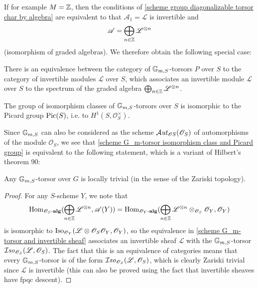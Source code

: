 If for example $M=\mathbb{Z}$, then the conditions of \cref{scheme group diagonalizable torsor char by algebra} are equivalent to that $\mathscr{A}_1=\mathscr{L}$ is invertible and 
\[\mathscr{A}=\bigoplus_{n\in\mathbb{Z}}\mathscr{L}^{\otimes n}\]
(isomorphism of graded algebras). We therefore obtain the following special case:

\begin{corollary}\label{scheme G_m-torsor and invertible sheaf}
There is an equivalence between the category of $\mathbb{G}_{m,S}$-torsors $P$ over $S$ to the category of invertible modules $\mathscr{L}$ over $S$, which associates an invertible module $\mathscr{L}$ over $S$ to the spectrum of the graded algebra $\bigoplus_{n\in\mathbb{Z}}\mathscr{L}^{\otimes n}$.
\end{corollary}

\begin{corollary}\label{scheme G_m-torsor isomorphism class and Picard group}
The group of isomorphism classes of $\mathbb{G}_{m,S}$-torsors over $S$ is isomorphic to the Picard group $\mathrm{Pic}(S)$, i.e. to $H^1(S,\mathscr{O}_S^\times)$.
\end{corollary}

Since $\mathbb{G}_{m,S}$ can also be considered as the scheme $\operatorname{\mathcal{A}\hspace*{-0.2pt}\textit{ut}\hspace{0.5pt}}_{\mathscr{O}S}(\mathscr{O}_S)$ of automorphisms of the module $\mathscr{O}_S$, we see that \cref{scheme G_m-torsor isomorphism class and Picard group} is equivalent to the following statement, which is a variant of Hilbert's theorem 90:

\begin{corollary}\label{scheme G_m-torsor Zariski local trivial}
Any $\mathbb{G}_{m,S}$-torsor over $G$ is locally trivial (in the sense of the Zariski topology).
\end{corollary}
\begin{proof}
For any $S$-scheme $Y$, we note that
\[\mathrm{Hom}_{\mathscr{O}_S\text{-}\mathbf{alg}}(\bigoplus_{n\in\mathbb{Z}}\mathscr{L}^{\otimes n},\mathscr{A}(Y))=\mathrm{Hom}_{\mathscr{O}_Y\textup{-}\mathbf{alg}}(\bigoplus_{n\in\mathbb{Z}}\mathscr{L}^{\otimes n}\otimes_{\mathscr{O}_S}\mathscr{O}_Y,\mathscr{O}_Y)\]
is isomorphic to $\mathrm{Iso}_{\mathscr{O}_Y}(\mathscr{L}\otimes\mathscr{O}_S\mathscr{O}_Y,\mathscr{O}_Y)$, so the equivalence in \cref{scheme G_m-torsor and invertible sheaf} associates an invertible sheaf $\mathscr{L}$ with the $\mathbb{G}_{m,S}$-torsor $\operatorname{\mathcal{I}\hspace*{-0.5pt}\textit{so}\hspace{0.5pt}}_{\mathscr{O}_S}(\mathscr{L},\mathscr{O}_S)$. The fact that this is an equivalence of categories means that every $\mathbb{G}_{m,S}$-torsor is of the form $\operatorname{\mathcal{I}\hspace*{-0.5pt}\textit{so}\hspace{0.5pt}}_{\mathscr{O}_S}(\mathscr{L},\mathscr{O}_S)$, which is clearly Zariski trivial since $\mathscr{L}$ is invertible (this can also be proved using the fact that invertible sheaves have fpqc descent).
\end{proof}

